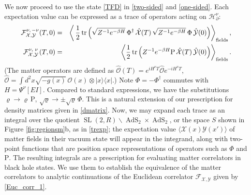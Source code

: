 \documentclass[12pt]{article}
\newcommand{\bea}{\begin{eqnarray}}
\newcommand{\eea}{\end{eqnarray}}
\newcommand{\lt}{\left}
\newcommand{\rt}{\right}
\newcommand*{\bra}[1]{\langle{#1}|}
\newcommand*{\ket}[1]{|{#1}\rangle}
\newcommand*{\corr}[1]{\langle{#1}\rangle}
\newcommand{\calF}{\mathcal{F}}
\newcommand{\calH}{\mathcal{H}}
\newcommand{\calO}{\mathcal{O}}
\newcommand{\calX}{\mathcal{X}}
\newcommand{\calY}{\mathcal{Y}}
\newcommand{\RR}{\mathbb{R}}
\DeclareMathOperator{\tr}{tr}
\DeclareMathOperator{\tSL}{\widetilde{\mathrm{SL}}}
\DeclareMathOperator{\tAdS}{\widetilde{AdS}}
\newcommand{\Rho}{\mathrm{P}}
\newcommand{\ov}{\over}
\newcommand{\p}{\partial}
\def\widetilde#1{#1}%
\def\RR{R}
\begin{document}
We now proceed to use the state \eqref{TFD} in \eqref{two-sided} and \eqref{one-sided}. Each expectation value can be expressed as a trace of operators acting on $\calH^{\nu}_{\p}$:
\bea
\label{2sided-tr}\tensor*{\calF}{*^{\nu,\, -\nu}_{\calX,\calY}}(T,0)&=&\lt \langle\,{1 \ov 2}\tr \left( \sqrt{Z^{-1}e^{-\beta H}}\,\Phi^{\dagger}\, \hat{\calX}(T)\, \sqrt{Z^{-1}e^{-\beta H}}\, \Phi \,\hat{\calY}(0) \right) \rt \rangle_{\text{fields}}, \\
\label{1sided-tr}
\tensor*{\calF}{*^{\nu,}_{\calX,}^{\nu}_{\calY}}(T,0)&=&\lt \langle{1 \ov 2}\tr \lt(Z^{-1}e^{-\beta H}\Rho\, \hat{\calX}(T)\,\hat{\calY}(0) \rt) \rt \rangle_{\text{fields}}.
\eea
(The matter operators are defined as $\hat{\calO}(T)=e^{iH^{\nu}T}\hat{\calO}e^{-iH^{\nu}T}$,\, $\hat{\calO}=\int d^2x \sqrt{-g(x)}\, \calO(x)\otimes \ket{x}\bra{x}$.) Note $\Phi=-\Phi^{\dagger}$ commutes with $H= \Psi^{\nu}[E I]$. Compared to standard expressions, we have the substitutions $\varrho \to \varrho\, \Rho$, $\sqrt{\varrho} \to \pm \sqrt{\varrho}\, \Phi$. This is a natural extension of our prescription for density matrices given in \eqref{dmatrix}. Now, we may expand each trace as an integral over the quotient $\tSL(2,\RR)\backslash \tAdS_2 \times \tAdS_2$, or the space $S$ shown in Figure \ref{fig:regionsm}b, as in \eqref{trexp}; the expectation value $\corr{\calX(x)\calY(x')}$ of matter fields in their vacuum state will appear in the integrand, along with two-point functions that are position space representations of operators such as $\Phi$ and $\Rho$. The resulting integrals are a prescription for evaluating matter correlators in black hole states. We use them to establish the equivalence of the matter correlators to analytic continuations of the Euclidean correlator $\calF_{\calX,\calY}$ given by \eqref{Euc_corr_1}. 

\end{document}
